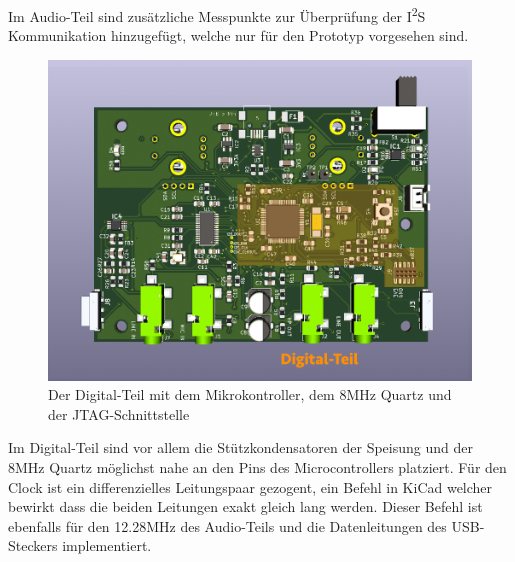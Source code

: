 Im Audio-Teil sind zusätzliche Messpunkte zur Überprüfung der I\textsuperscript{2}S Kommunikation hinzugefügt, welche nur für den Prototyp vorgesehen sind. 

\begin{figure} [H]
\begin{center}
 \includegraphics[scale=0.35]{../graphics/PCB-Layout_DGTL.jpg}
 \caption{Der Digital-Teil mit dem Mikrokontroller, dem 8MHz Quartz und der JTAG-Schnittstelle}
\label{fig:PCB_DGTL}
\end{center}
\end{figure}

Im Digital-Teil sind vor allem die Stützkondensatoren der Speisung und der 8MHz Quartz möglichst nahe an den Pins des Microcontrollers platziert. Für den Clock ist ein differenzielles Leitungspaar gezogent, ein Befehl in KiCad welcher bewirkt dass die beiden Leitungen exakt gleich lang werden. Dieser Befehl ist ebenfalls für den 12.28MHz des Audio-Teils und die Datenleitungen des USB-Steckers implementiert.

